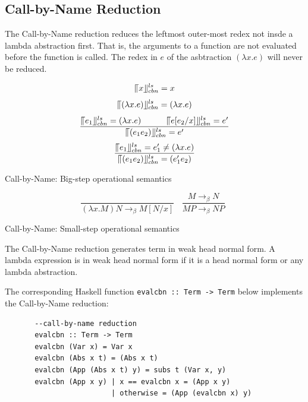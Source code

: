 \subsection{Call-by-Name Reduction}{\label{subsec:cbn}}

The Call-by-Name reduction reduces the leftmost outer-most redex not insde a lambda abstraction first. That is, the arguments to a function are not evaluated before the function is called. The redex in $e$ of the asbtraction $(\lambda x.e)$ will never be reduced. 


\begin{equation*}
\llceil x \rrfloor ^{ls} _{cbn} = x
\end{equation*}
\begin{equation*}
\llceil (\lambda x.e) \rrfloor ^{ls} _{cbn} = (\lambda x.e)
\end{equation*}
\begin{equation*}
\frac{\llceil e_1 \rrfloor ^{ls} _{cbn} = (\lambda x.e)\ \ \ \ \ \ \ \ \ \llceil e[e_2/x] \rrfloor ^{ls} _{cbn} = e'}{\llceil (e_1e_2) \rrfloor ^{ls} _{cbn} = e'}
\end{equation*}
\begin{equation*}
\frac{\llceil e_1 \rrfloor ^{ls} _{cbn} = e'_1\neq (\lambda x.e)}{\llceil (e_1e_2) \rrfloor ^{ls} _{cbn} = (e'_1e_2)}
\end{equation*}
\begin{center}
Call-by-Name: Big-step operational semantics
\end{center}

\begin{equation*}
\frac{}{(\lambda x.M)N \rightarrow _\beta M[N/x]}\ \ \ \  
\frac{M \rightarrow _\beta N}{MP \rightarrow _\beta NP}\ \ 
\end{equation*}
\begin{center}
Call-by-Name: Small-step operational semantics
\end{center}

The Call-by-Name reduction generates term in weak head normal form. A lambda expression is in weak head normal form if it is a head normal form or any lambda abstraction. 


The corresponding Haskell function \verb|evalcbn :: Term -> Term| below implements the Call-by-Name reduction:

\begin{verbatim}
       --call-by-name reduction
       evalcbn :: Term -> Term
       evalcbn (Var x) = Var x
       evalcbn (Abs x t) = (Abs x t)
       evalcbn (App (Abs x t) y) = subs t (Var x, y)
       evalcbn (App x y) | x == evalcbn x = (App x y)
	                     | otherwise = (App (evalcbn x) y) 
\end{verbatim}


